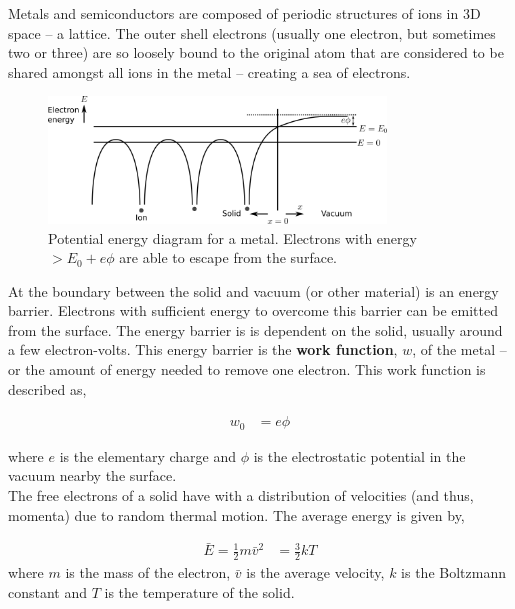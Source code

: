 Metals and semiconductors are composed of periodic structures of ions in 3D space -- a lattice. The outer shell electrons (usually one electron, but sometimes two or three) are so loosely bound to the original atom that are considered to be shared amongst all ions in the metal -- creating a sea of electrons. \\

\begin{figure}[H]
    \centering
    \includegraphics[width=0.8\textwidth]{figures/Theory1.png}
    \caption{Potential energy diagram for a metal. Electrons with energy $>E_0 + e\phi$ are able to escape from the surface.}
    \label{PotentialEnergy_Figure}
\end{figure}

At the boundary between the solid and vacuum (or other material) is an energy barrier. Electrons with sufficient energy to overcome this barrier can be emitted from the surface. The energy barrier is is dependent on the solid, usually around a few electron-volts. This energy barrier is the 
\textbf{work function}, $w$, of the metal -- or the amount of energy needed to remove one electron. This work function is described as,

\begin{align}
    w_0 &= e\phi
\end{align}

where $e$ is the elementary charge and $\phi$ is the electrostatic potential in the vacuum nearby the surface.\\

The free electrons of a solid have with a distribution of velocities (and thus, momenta) due to random thermal motion. The average energy is given by,

\begin{align}
    \bar{E} = \frac{1}{2} m \bar{v}^2 &= \frac{3}{2} k T \label{Kin_Tem_EnergyRelation}
\end{align}
where $m$ is the mass of the electron, $\bar{v}$ is the average velocity, $k$ is the Boltzmann constant and $T$ is the temperature of the solid.\\

